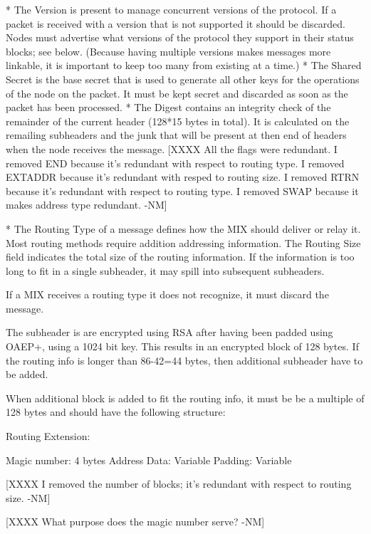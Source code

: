 * The Version is present to manage concurrent versions of the
protocol. If a packet is received with a version that is not supported
it should be discarded. Nodes must advertise what versions of the
protocol they support in their status blocks; see below.
(Because having multiple versions makes messages more linkable, it is
important to keep too many from existing at a time.)
* The Shared Secret is the base secret that is used to generate all
other keys for the operations of the node on the packet. It must be
kept secret and discarded as soon as the packet has been processed. 
* The Digest contains an integrity check of the remainder of the
current header (128*15 bytes in total).  It is calculated on the
remailing subheaders and the junk that will be present at then end 
of headers when the node receives the message. 
   [XXXX All the flags were redundant. 
    I removed END because it's redundant with respect to routing type.
    I removed EXTADDR because it's redundant with resped to routing
      size.
    I removed RTRN because it's redundant with respect to routing
       type.
    I removed SWAP because it makes address type redundant.   -NM]

* The Routing Type of a message defines how the MIX should deliver or
  relay it.  Most routing methods require addition addressing information.
  The Routing Size field indicates the total size of the routing
  information.   If the information is too long to fit in a single
  subheader, it may spill into subsequent subheaders.

  If a MIX receives a routing type it does not recognize, it must
  discard the message. 

  The subheader is are encrypted using RSA after having been padded
  using OAEP+, using a 1024 bit key.  This results in an encrypted block
  of 128 bytes.  If the routing info is longer than 86-42=44 bytes, then
  additional subheader have to be added.

  When additional block is added to fit the routing info, it must be be a
  multiple of 128 bytes and should have the following structure:
 
  Routing Extension:

    Magic number:     4 bytes
    Address Data:     Variable
    Padding:          Variable

  [XXXX I removed the number of blocks; it's redundant with respect to
  routing size. -NM]

  [XXXX What purpose does the magic number serve? -NM]

